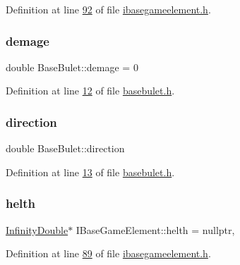 Definition at line \hyperlink{a00047_source_l00092}{92} of file \hyperlink{a00047_source}{ibasegameelement.\+h}.

\mbox{\label{a00153_af945a06780b38cebab807ff1ad63eb7a}} 
\subsubsection{\texorpdfstring{demage}{demage}}
{\footnotesize\ttfamily double Base\+Bulet\+::demage = 0\hspace{0.3cm}{\ttfamily [protected]}}



Definition at line \hyperlink{a00035_source_l00012}{12} of file \hyperlink{a00035_source}{basebulet.\+h}.

\mbox{\label{a00153_a16b71d8fb0386d4b048ca96c8c806896}} 
\subsubsection{\texorpdfstring{direction}{direction}}
{\footnotesize\ttfamily double Base\+Bulet\+::direction\hspace{0.3cm}{\ttfamily [protected]}}



Definition at line \hyperlink{a00035_source_l00013}{13} of file \hyperlink{a00035_source}{basebulet.\+h}.

\mbox{\label{a00137_a440cf9e7d61c33482ab256a6e944b34d}} 
\subsubsection{\texorpdfstring{helth}{helth}}
{\footnotesize\ttfamily \hyperlink{a00161}{Infinity\+Double}$\ast$ I\+Base\+Game\+Element\+::helth = nullptr\hspace{0.3cm}{\ttfamily [protected]}, {\ttfamily [inherited]}}



Definition at line \hyperlink{a00047_source_l00089}{89} of file \hyperlink{a00047_source}{ibasegameelement.\+h}.

